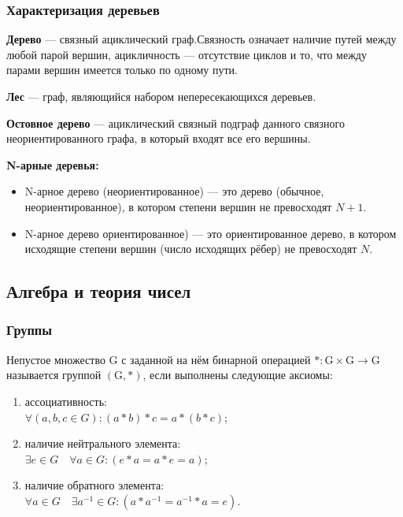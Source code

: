 \documentclass[12pt]{matmex-diploma}
\begin{document}
        \subsubsection*{Характеризация деревьев}    
        
            \textbf{Дерево} — связный ациклический граф.Связность означает наличие путей между любой парой вершин, ацикличность — отсутствие циклов и то, что между парами вершин имеется только по одному пути.
            
            \textbf{Лес} — граф, являющийся набором непересекающихся деревьев.
            
            \textbf{Остовное дерево} — ациклический связный подграф данного связного неориентированного графа, в который входят все его вершины.
            
            \textbf{N-арные деревья:}
            \begin{itemize}
                \item N-арное дерево (неориентированное) — это дерево (обычное, неориентированное), в котором степени вершин не превосходят $N+1$.
                \item N-арное дерево ориентированное) — это ориентированное дерево, в котором исходящие степени вершин (число исходящих рёбер) не превосходят $N$.
            \end{itemize}
        
    \subsection{Алгебра и теория чисел}
        
        \subsubsection*{Группы}
            Непустое множество G с заданной на нём бинарной операцией $*:\mathrm{G} \times \mathrm{G} \rightarrow \mathrm{G}$ называется группой $(\mathrm {G} ,*)$, если выполнены следующие аксиомы:
            \begin{enumerate}
                \item ассоциативность: \\$\forall (a,b,c\in G)\colon (a*b)*c=a*(b*c)$;
                \item наличие нейтрального элемента: \\$\exists e\in G\quad \forall a\in G\colon (e*a=a*e=a)$;
                \item наличие обратного элемента: \\$\forall a\in G\quad \exists a^{-1}\in G\colon (a*a^{-1}=a^{-1}*a=e)$.
            \end{enumerate}
            
\end{document}
